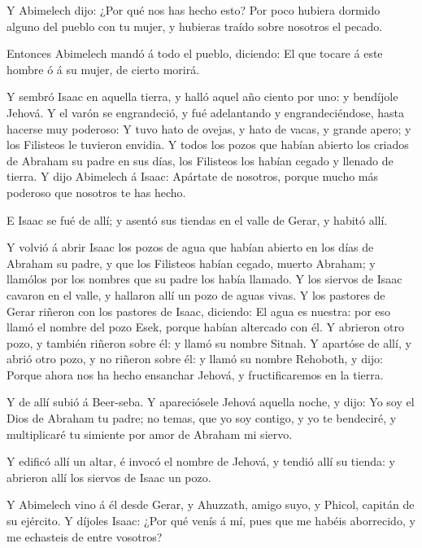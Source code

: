  Y Abimelech dijo: ¿Por qué nos has hecho esto? Por poco
hubiera dormido alguno del pueblo con tu mujer, y hubieras traído sobre
nosotros el pecado.

 Entonces Abimelech mandó á todo el pueblo, diciendo: El
que tocare á este hombre ó á su mujer, de cierto morirá.

 Y sembró Isaac en aquella tierra, y halló aquel año ciento
por uno: y bendíjole Jehová.  Y el varón se engrandeció, y
fué adelantando y engrandeciéndose, hasta hacerse muy poderoso:
 Y tuvo hato de ovejas, y hato de vacas, y grande apero; y
los Filisteos le tuvieron envidia.  Y todos los pozos que
habían abierto los criados de Abraham su padre en sus días, los
Filisteos los habían cegado y llenado de tierra.  Y dijo
Abimelech á Isaac: Apártate de nosotros, porque mucho más poderoso que
nosotros te has hecho.

 E Isaac se fué de allí; y asentó sus tiendas en el valle
de Gerar, y habitó allí.

 Y volvió á abrir Isaac los pozos de agua que habían
abierto en los días de Abraham su padre, y que los Filisteos habían
cegado, muerto Abraham; y llamólos por los nombres que su padre los
había llamado.  Y los siervos de Isaac cavaron en el valle,
y hallaron allí un pozo de aguas vivas.  Y los pastores de
Gerar riñeron con los pastores de Isaac, diciendo: El agua es nuestra:
por eso llamó el nombre del pozo Esek, porque habían altercado con él.
 Y abrieron otro pozo, y también riñeron sobre él: y llamó
su nombre Sitnah.  Y apartóse de allí, y abrió otro pozo, y
no riñeron sobre él: y llamó su nombre Rehoboth, y dijo: Porque ahora
nos ha hecho ensanchar Jehová, y fructificaremos en la tierra.

 Y de allí subió á Beer-seba.  Y apareciósele
Jehová aquella noche, y dijo: Yo soy el Dios de Abraham tu padre; no
temas, que yo soy contigo, y yo te bendeciré, y multiplicaré tu simiente
por amor de Abraham mi siervo.

 Y edificó allí un altar, é invocó el nombre de Jehová, y
tendió allí su tienda: y abrieron allí los siervos de Isaac un pozo.

 Y Abimelech vino á él desde Gerar, y Ahuzzath, amigo suyo,
y Phicol, capitán de su ejército.  Y díjoles Isaac: ¿Por
qué venís á mí, pues que me habéis aborrecido, y me echasteis de entre
vosotros?


